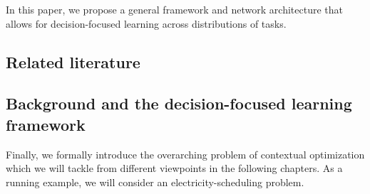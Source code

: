 \documentclass{article}
\theoremstyle{plain}
\theoremstyle{definition}
\theoremstyle{remark}
\begin{document}
In this paper, we propose a general framework and network architecture that allows for decision-focused learning across distributions of tasks. 

\subsection{Related literature}

\subsection{Background and the decision-focused learning framework}

Finally, we formally introduce the overarching problem of contextual optimization which we will tackle from different viewpoints in the following chapters. As a running example, we will consider an electricity-scheduling problem.
\end{document}

